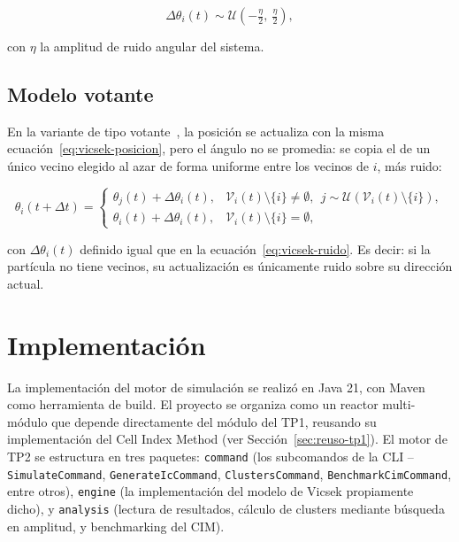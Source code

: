 \documentclass[a4paper,11pt]{article}
\begin{document}
\begin{equation}
  \Delta\theta_i(t) \sim \mathcal{U}\!\left(-\tfrac{\eta}{2},\ \tfrac{\eta}{2}\right),
  \label{eq:vicsek-ruido}
\end{equation}

con $\eta$ la amplitud de ruido angular del sistema.

\subsection{Modelo votante}
\label{sec:modelo-votante}

En la variante de tipo votante~\cite{ref:loscar2021,ref:baglietto2016}, la
posición se actualiza con la misma ecuación~\eqref{eq:vicsek-posicion}, pero
el ángulo no se promedia: se copia el de un único vecino elegido al azar de
forma uniforme entre los vecinos de $i$, más ruido:

\begin{equation}
  \theta_i(t+\Delta t) =
  \begin{cases}
    \theta_{j}(t) + \Delta\theta_i(t), & \mathcal{V}_i(t) \setminus \{i\} \neq \emptyset,\ \ j \sim \mathcal{U}\left(\mathcal{V}_i(t) \setminus \{i\}\right), \\[1mm]
    \theta_i(t) + \Delta\theta_i(t), & \mathcal{V}_i(t) \setminus \{i\} = \emptyset,
  \end{cases}
  \label{eq:votante-angulo}
\end{equation}

con $\Delta\theta_i(t)$ definido igual que en la ecuación~\eqref{eq:vicsek-ruido}.
Es decir: si la partícula no tiene vecinos, su actualización es únicamente
ruido sobre su dirección actual.

\section{Implementación}
\label{sec:implementacion}

La implementación del motor de simulación se realizó en Java 21, con Maven
como herramienta de build. El proyecto se organiza como un reactor
multi-módulo que depende directamente del módulo del TP1, reusando su
implementación del Cell Index Method (ver Sección~\ref{sec:reuso-tp1}). El
motor de TP2 se estructura en tres paquetes: \texttt{command} (los
subcomandos de la CLI -- \texttt{SimulateCommand}, \texttt{GenerateIcCommand},
\texttt{ClustersCommand}, \texttt{BenchmarkCimCommand}, entre otros),
\texttt{engine} (la implementación del modelo de Vicsek propiamente dicho), y
\texttt{analysis} (lectura de resultados, cálculo de clusters mediante
búsqueda en amplitud, y benchmarking del CIM).
\end{document}
